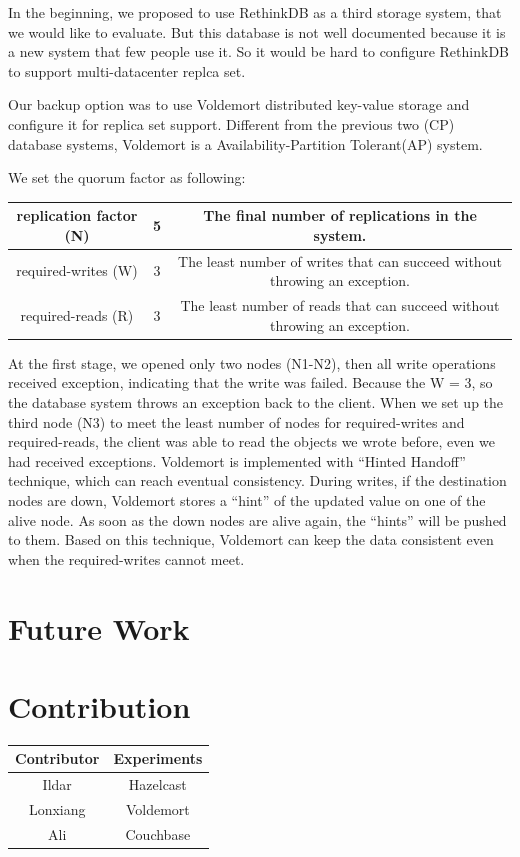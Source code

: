\documentclass[a4paper]{article}
\begin{document}
In the beginning, we proposed to use RethinkDB as a third storage system, that we would like to evaluate. But this database is not well documented because it is a new system that few people use it. So it would be hard to configure RethinkDB to support multi-datacenter replca set.

Our backup option was to use Voldemort distributed key-value storage and configure it for replica set support. Different from the previous two (CP) database systems, Voldemort is a Availability-Partition Tolerant(AP) system. 

We set the quorum factor as following:

\begin{table}[hb]
  \centering
  \begin{tabular}{|c|c|c|}
    \hline
    replication factor (N) & 5 & The final number of replications in the system. \\
    \hline
    required-writes (W) & 3 & The least number of writes that can succeed without throwing an exception. \\
    \hline
    required-reads (R) & 3 & The least number of reads that can succeed without throwing an exception. \\
    \hline
  \end{tabular}
\end{table}

At the first stage, we opened only two nodes (N1-N2), then all write operations received exception, indicating that the write was failed. Because the W = 3, so the database system throws an exception back to the client. When we set up the third node (N3) to meet the least number of nodes for required-writes and required-reads, the client was able to read the objects we wrote before, even we had received exceptions. Voldemort is implemented with ``Hinted Handoff'' technique, which can reach eventual consistency. During writes, if the destination nodes are down, Voldemort stores a ``hint'' of the updated value on one of the alive node. As soon as the down nodes are alive again, the ``hints'' will be pushed to them. Based on this technique, Voldemort can keep the data consistent even when the required-writes cannot meet.



\section{Future Work}

\section*{Contribution}

\begin{table}[h]
	\centering
	\begin{tabular}{|c|c|}
		\hline
		\rowcolor{light-gray} \textbf{Contributor} & \textbf{Experiments} \\ \hline
		Ildar & Hazelcast  \\ \hline
		Lonxiang & Voldemort  \\ \hline
		Ali & Couchbase  \\ \hline
	\end{tabular}
\end{table}

\printbibliography
\end{document}
